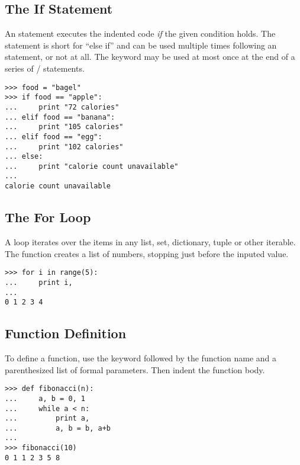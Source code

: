 \subsection*{The If Statement}
An  statement executes the 
indented code \emph{if} the given condition holds.
The  statement is short for ``else if'' and can be used multiple times following an  statement, or not at all. 
The  keyword may be used at most once at the end of a series of / statements.
\begin{lstlisting}
>>> food = "bagel"
>>> if food == "apple":
...     print "72 calories"
... elif food == "banana":
...     print "105 calories"
... elif food == "egg":
...     print "102 calories"
... else: 
...     print "calorie count unavailable"
...     
calorie count unavailable
\end{lstlisting}


\subsection*{The For Loop}
A  loop iterates over the items in any list, set, dictionary, tuple or other iterable. 
The  function creates a list of numbers, stopping just before the inputed value. 

\begin{lstlisting}
>>> for i in range(5):
...     print i,
...     
0 1 2 3 4
\end{lstlisting}


\subsection*{Function Definition}
To define a function, use the  keyword followed by the function name and a parenthesized list of formal parameters. Then indent the function body.
\begin{lstlisting}
>>> def fibonacci(n):
...     a, b = 0, 1
...     while a < n:
...         print a,
...         a, b = b, a+b
...         
>>> fibonacci(10)
0 1 1 2 3 5 8
\end{lstlisting}

